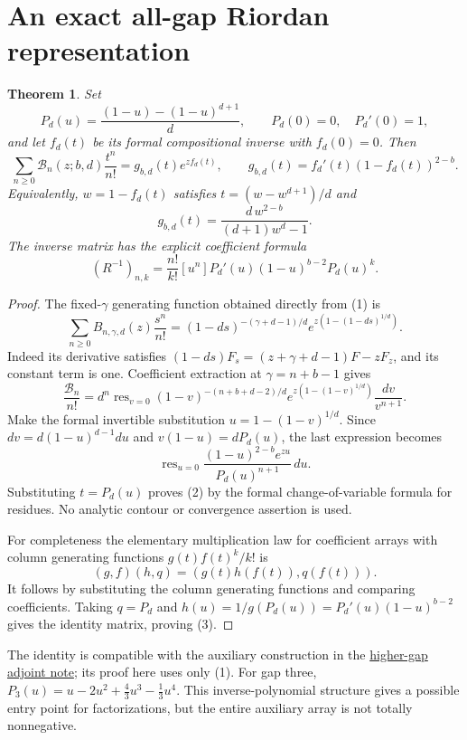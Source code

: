 \documentclass[11pt]{article}
\newtheorem{theorem}{Theorem}
\begin{document}
\section{An exact all-gap Riordan representation}
\begin{theorem}\label{thm:Riordan}
Set
\[
 P_d(u)=\frac{(1-u)-(1-u)^{d+1}}d,\qquad P_d(0)=0,
 \quad P_d'(0)=1,
\]
and let $f_d(t)$ be its formal compositional inverse with $f_d(0)=0$.
Then
\[
 \sum_{n\ge0}\mathcal B_n(z;b,d)\frac{t^n}{n!}
 =g_{b,d}(t)e^{zf_d(t)},\qquad
 g_{b,d}(t)=f_d'(t)(1-f_d(t))^{2-b}.                         \tag{2}
\]
Equivalently, $w=1-f_d(t)$ satisfies
$t=(w-w^{d+1})/d$ and
\[
 g_{b,d}(t)=\frac{d\,w^{2-b}}{(d+1)w^d-1}.
\]
The inverse matrix has the explicit coefficient formula
\[
 (R^{-1})_{n,k}=\frac{n!}{k!}[u^n]
          P_d'(u)(1-u)^{b-2}P_d(u)^k.                      \tag{3}
\]
\end{theorem}
\begin{proof}
The fixed-$\gamma$ generating function obtained directly from (1) is
\[
 \sum_{n\ge0}B_{n,\gamma,d}(z)\frac{s^n}{n!}
 =(1-ds)^{-(\gamma+d-1)/d}
            e^{z(1-(1-ds)^{1/d})}.
\]
Indeed its derivative satisfies
$(1-ds)F_s=(z+\gamma+d-1)F-zF_z$, and its constant term is one.
Coefficient extraction at $\gamma=n+b-1$ gives
\[
 \frac{\mathcal B_n}{n!}
 =d^n\operatorname{res}_{v=0}
  (1-v)^{-(n+b+d-2)/d}
  e^{z(1-(1-v)^{1/d})}\frac{dv}{v^{n+1}}.
\]
Make the formal invertible substitution $u=1-(1-v)^{1/d}$.
Since $dv=d(1-u)^{d-1}du$ and
$v(1-u)=dP_d(u)$, the last expression becomes
\[
 \operatorname{res}_{u=0}
       \frac{(1-u)^{2-b}e^{zu}}{P_d(u)^{n+1}}\,du.
\]
Substituting $t=P_d(u)$ proves (2) by the formal change-of-variable
formula for residues. No analytic contour or convergence assertion
is used.

For completeness the elementary multiplication law for coefficient
arrays with column generating functions $g(t)f(t)^k/k!$ is
\[
 (g,f)(h,q)=(g(t)h(f(t)),q(f(t))).
\]
It follows by substituting the column generating functions and
comparing coefficients. Taking $q=P_d$ and
$h(u)=1/g(P_d(u))=P_d'(u)(1-u)^{b-2}$ gives the identity matrix,
proving (3).
\end{proof}

The identity is compatible with the auxiliary construction in the
\href{HIGHER_GAP_ADJOINT_RANK.tex}{higher-gap adjoint note};
its proof here uses only (1).
For gap three,
$P_3(u)=u-2u^2+\tfrac43u^3-\tfrac13u^4$.
This inverse-polynomial structure gives a possible entry point for
factorizations, but the entire auxiliary array is not totally
nonnegative.
\end{document}

